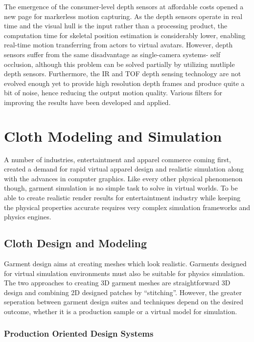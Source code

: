  The emergence of the consumer-level depth sensors at affordable costs opened a new page for markerless motion capturing\cite{Dutta2012}. As the depth sensors operate in real time
 and the visual hull is the input rather than a processing product, the computation time for skeletal position estimation is considerably lower, enabling 
 real-time motion transferring from actors to virtual avatars. However, depth sensors suffer from the same disadvantage as single-camera systems- self occlusion,
 although this problem can be solved partially by utilizing mutliple depth sensors\cite{Berger2011}.
 Furthermore, the IR and TOF depth sensing technology are not evolved enough yet to provide high resolution depth frames and produce quite a bit of noise, hence 
 reducing the output motion quality. Various filters for improving the results have been developed and applied\cite{Matyunin2011,Camplani2012}. 
 
 \section{Cloth Modeling and Simulation}
 
 A number of industries, entertaintment and apparel commerce coming first, created a demand for rapid virtual apparel design and realistic simulation along 
 with the advances in computer graphics. Like every other physical phenomenon though, garment simulation is no simple task to solve in virtual worlds. To be able
 to create realistic render results for entertaintment industry while keeping the physical properties accurate requires very complex simulation frameworks and 
 physics engines. 
 
 \subsection{Cloth Design and Modeling}
 
 Garment design aims at creating meshes which look realistic. Garments designed for virtual simulation environments must also be suitable for physics simulation. 
 The two approaches to creating 3D garment meshes are straightforward 3D design and combining 2D designed patches by ``stitching''. However, the greater seperation
 between garment design suites and techniques depend on the desired outcome, whether it is a production sample or a virtual model for simulation.
 
\subsubsection{Production Oriented Design Systems}

